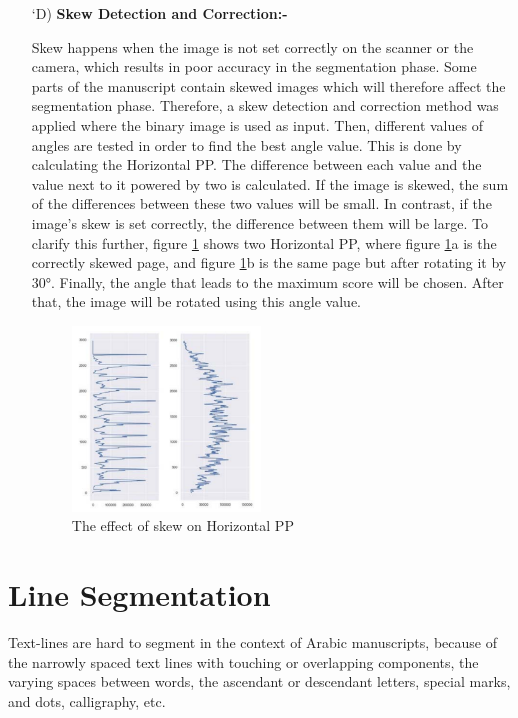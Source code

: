 \begin{itemize}[labelindent=1em,labelsep=0.25cm,leftmargin=*]
        \item[\char `D)] \textbf{Skew Detection and Correction:-}
        
        Skew happens when the image is not set correctly on the
        scanner or the camera, which results in poor accuracy in the
        segmentation phase.
        Some parts of the manuscript contain skewed images which
        will therefore affect the segmentation phase. Therefore, a skew
        detection and correction method was applied where the binary
        image is used as input. Then, different values of angles are
        tested in order to find the best angle value. This is done by
        calculating the Horizontal PP. The difference between each
        value and the value next to it powered by two is calculated. If
        the image is skewed, the sum of the differences between these
        two values will be small. In contrast, if the image’s skew is
        set correctly, the difference between them will be large. To
        clarify this further, figure \ref{fig:skew} shows two Horizontal PP, where
        figure \ref{fig:skew}a is the correctly skewed page, and figure \ref{fig:skew}b is the same
        page but after rotating it by 30°. Finally, the angle that leads
        to the maximum score will be chosen. After that, the image
        will be rotated using this angle value.
        \begin{figure}[!htb]
            \centering
            \includegraphics[width=5cm]{images/skew.png}
            \caption{The effect of skew on Horizontal PP}
            \label{fig:skew}
        \end{figure}
    \end{itemize}

\clearpage

\section{Line Segmentation}
Text-lines are hard to segment in the context of Arabic manuscripts, because of the narrowly spaced text lines with touching or overlapping components, the varying spaces between words, the ascendant or descendant letters, special marks, and dots, calligraphy, etc.\\

